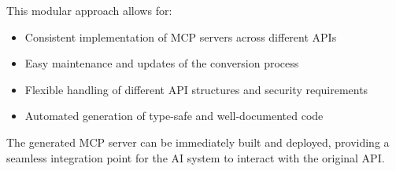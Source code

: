 \documentclass[../Main.tex]{subfiles}
\begin{document}
This modular approach allows for:
\begin{itemize}
    \item Consistent implementation of MCP servers across different APIs
    \item Easy maintenance and updates of the conversion process
    \item Flexible handling of different API structures and security requirements
    \item Automated generation of type-safe and well-documented code
\end{itemize}

The generated MCP server can be immediately built and deployed, providing a seamless integration point for the AI system to interact with the original API.
\end{document}

